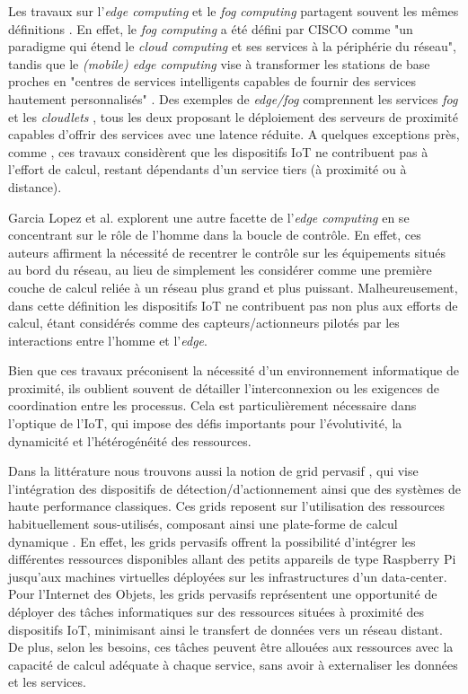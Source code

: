 Les travaux sur l'\textit{edge computing} et le \textit{fog computing} partagent souvent les mêmes définitions \cite{Vermesan}. En effet, le \textit{fog computing} a été défini par CISCO \cite{FogCISCO} comme "un paradigme qui étend le \textit{cloud computing} et ses services à la périphérie du réseau", tandis que le \textit{(mobile) edge computing} vise à transformer les stations de base proches en "centres de services intelligents capables de fournir des services hautement personnalisés" \cite{Vermesan}. Des exemples de \textit{edge/fog} comprennent les services \textit{fog} \cite{Bonomi2012} et les \textit{cloudlets} \cite{Satyanarayanan09}, tous les deux proposant le déploiement des serveurs de proximité capables d'offrir des services avec une latence réduite. A quelques exceptions près, comme \cite{Dey2013}, ces travaux considèrent que les dispositifs IoT ne contribuent pas à l'effort de calcul, restant dépendants d'un service tiers (à proximité ou à distance).

Garcia Lopez et al. \cite{Lopez2015} explorent une autre facette de l'\textit{edge computing} en se concentrant sur le rôle de l'homme dans la boucle de contrôle. En effet, ces auteurs affirment la nécessité de recentrer le contrôle sur les équipements situés au bord du réseau, au lieu de simplement les considérer comme une première couche de calcul reliée à un réseau plus grand et plus puissant. %
Malheureusement, dans cette définition les dispositifs IoT ne contribuent pas non plus aux efforts de calcul, étant considérés comme des capteurs/actionneurs pilotés par les interactions entre l'homme et l'\textit{edge}.

Bien que ces travaux préconisent la nécessité d'un environnement informatique de proximité, ils oublient souvent de détailler l'interconnexion ou les exigences de coordination entre les processus. Cela est particulièrement nécessaire dans l'optique de l'IoT, qui impose des défis importants pour l'évolutivité, la dynamicité et l'hétérogénéité des ressources. 

Dans la littérature nous trouvons aussi la notion de grid pervasif \cite{Parashar2010}, qui vise l'intégration des dispositifs de détection/d'actionnement ainsi que des systèmes de haute performance classiques. Ces grids reposent sur l'utilisation des ressources habituellement sous-utilisés, composant ainsi une plate-forme de calcul dynamique \cite{Steffenel2015Roma}. En effet, les grids pervasifs offrent la possibilité d'intégrer les différentes ressources disponibles allant des petits appareils de type Raspberry Pi jusqu'aux machines virtuelles déployées sur les infrastructures d'un data-center. Pour l'Internet des Objets, les grids pervasifs représentent une opportunité de déployer des tâches informatiques sur des ressources situées à proximité des dispositifs IoT, minimisant ainsi le transfert de données vers un réseau distant. De plus, selon les besoins, ces tâches peuvent être allouées aux ressources avec la capacité de calcul adéquate à chaque service, sans avoir à externaliser les données et les services.

